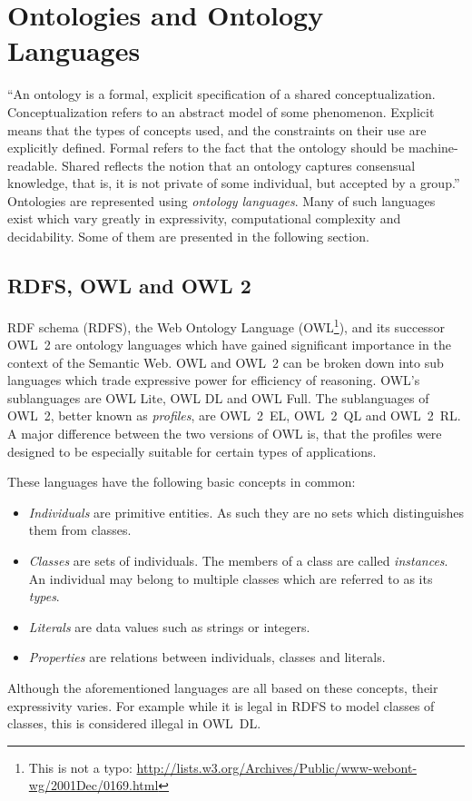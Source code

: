 \section{Ontologies and Ontology Languages}
``An ontology is a formal, explicit specification of a shared
conceptualization. Conceptualization refers to an abstract model
of some phenomenon. Explicit means that the types of concepts
used, and the constraints on their use are explicitly defined.
Formal refers to the fact that the ontology should be machine-
readable. Shared reflects the notion that an ontology captures
consensual knowledge, that is, it is not private of some
individual, but accepted by a group.''\cite{OntologyDefinition}
Ontologies are represented using \emph{ontology languages}.
Many of such languages exist which vary greatly in
expressivity, computational complexity and decidability. Some of them are
presented in the following section.

\subsection{RDFS, OWL and OWL 2}
\label{RDFBasedLanguages}
RDF schema (RDFS), the Web Ontology Language
(OWL\footnote{This is not a typo: \scriptsize\url{http://lists.w3.org/Archives/Public/www-webont-wg/2001Dec/0169.html}}),
and its successor \mbox{OWL 2} are ontology languages which have gained significant importance in the context of the Semantic Web.
OWL and \mbox{OWL 2} can be broken down into sub languages which trade
expressive power for efficiency of reasoning.
OWL's sublanguages are OWL Lite, OWL DL and OWL Full.
The sublanguages of \mbox{OWL 2}, better known as \emph{profiles}, are
\mbox{OWL 2 EL}, \mbox{OWL 2 QL} and \mbox{OWL 2 RL}. A major difference between
the two versions of OWL is, that the profiles were designed to be especially
suitable for certain types of applications.

These languages have the following basic concepts in common:
\begin{itemize}
  \item \emph{Individuals} are primitive entities. As such they are no sets
  which distinguishes them from classes.
  \item \emph {Classes} are sets of individuals. The members of a class are
  called \emph{instances}. An individual may belong to multiple classes which
  are referred to as its \emph{types}.
  \item \emph {Literals} are data values such as strings or integers.
  \item \emph {Properties} are relations between individuals, classes
  and literals.
\end{itemize}
Although the aforementioned languages are all based on these concepts, their
expressivity varies. For example while it is  legal in RDFS to model classes of
classes, this is considered illegal in \mbox{OWL DL}.


